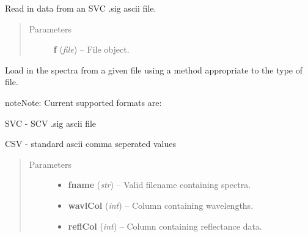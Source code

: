 \documentclass[letterpaper,10pt,english]{sphinxmanual}
\begin{document}
\begin{fulllineitems}
\begin{fulllineitems}
\begin{quote}
\begin{description}
\begin{itemize}
\end{itemize}

\end{description}\end{quote}

\end{fulllineitems}


\begin{fulllineitems}
\label{source/sentinelSimulator:sentinelSimulator.spectra.spectra.loadSVCSig}
Read in data from an SVC .sig ascii file.
\begin{quote}\begin{description}
\item[{Parameters}] \leavevmode
\textbf{f} (\emph{file}) -- File object.

\end{description}\end{quote}

\end{fulllineitems}


\begin{fulllineitems}
\label{source/sentinelSimulator:sentinelSimulator.spectra.spectra.loadSpectra}
Load in the spectra from a given file using a
method appropriate to the type of file.

\begin{notice}{note}{Note:}
Current supported formats are:

SVC - SCV .sig ascii file

CSV - standard ascii comma seperated values
\end{notice}
\begin{quote}\begin{description}
\item[{Parameters}] \leavevmode\begin{itemize}
\item {} 
\textbf{fname} (\emph{str}) -- Valid filename containing spectra.

\item {} 
\textbf{wavlCol} (\emph{int}) -- Column containing wavelengths.

\item {} 
\textbf{reflCol} (\emph{int}) -- Column containing reflectance data.


\end{itemize}
\end{description}
\end{quote}
\end{fulllineitems}
\end{fulllineitems}
\end{document}

